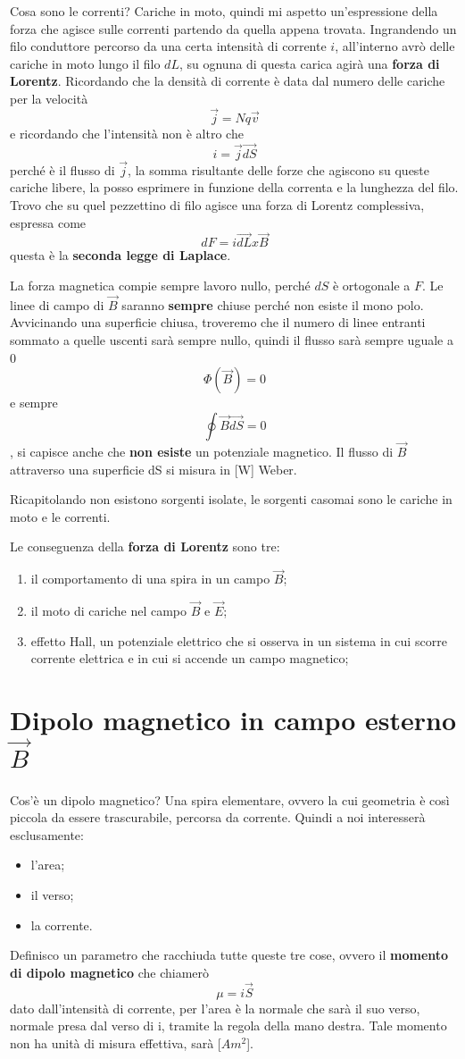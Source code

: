 \documentclass[a4paper, 12pt]{book}
\theoremstyle{plain}
\begin{document}
Cosa sono le correnti? Cariche in moto, quindi mi aspetto 
un'espressione della forza che agisce sulle correnti 
partendo da quella appena trovata. Ingrandendo un filo conduttore
percorso da una certa intensità di corrente $i$, all'interno 
avrò delle cariche in moto lungo il filo $dL$, su ognuna di questa 
carica agirà una \textbf{forza di Lorentz}. Ricordando che la 
densità di corrente è data dal numero delle cariche per 
la velocità \[ \vec{j} = Nq\vec{v} \] e ricordando che 
l'intensità non è altro che \[ i = \vec{j} \vec{dS} \] 
perché è il flusso di $\vec{j}$, la somma risultante delle 
forze che agiscono su queste cariche libere, la posso esprimere 
in funzione della correnta e la lunghezza del filo. Trovo 
che su quel pezzettino di filo agisce una forza di Lorentz
complessiva, espressa come \[ dF = i\vec{dL}x\vec{B} \] 
questa è la \textbf{seconda legge di Laplace}. 

La forza magnetica compie sempre lavoro nullo, perché $dS$ 
è ortogonale a $F$. Le linee di campo di $\vec{B}$ saranno \textbf{sempre} 
chiuse perché non esiste il mono polo. Avvicinando 
una superficie chiusa, troveremo che il numero di linee 
entranti sommato a quelle uscenti sarà sempre nullo, quindi 
il flusso sarà sempre uguale a 0 \[ \Phi (\vec{B}) = 0 \] 
e sempre \[ \oint \vec{B} \vec{dS} = 0 \], si capisce 
anche che \textbf{non esiste} un potenziale magnetico.
Il flusso di $\vec{B}$ attraverso una superficie dS si misura 
in [W] Weber.

Ricapitolando non esistono sorgenti isolate, le sorgenti 
casomai sono le cariche in moto e le correnti.

Le conseguenza della \textbf{forza di Lorentz} sono tre:
\begin{enumerate}
    \item il comportamento di una spira in un campo $\vec{B}$;
    \item il moto di cariche nel campo $\vec{B}$ e $\vec{E}$;
    \item effetto Hall, un potenziale elettrico che si osserva in un sistema in cui scorre corrente elettrica e in cui si accende un campo magnetico;
\end{enumerate}

\section{Dipolo magnetico in campo esterno $\vec{B}$}

Cos'è un dipolo magnetico? Una spira elementare,
ovvero la cui geometria è così piccola da 
essere trascurabile, percorsa da corrente. Quindi a noi 
interesserà esclusamente:
\begin{itemize}
    \item l'area;
    \item il verso; 
    \item la corrente.
\end{itemize}
Definisco un parametro che racchiuda tutte queste tre cose,
ovvero il \textbf{momento di dipolo magnetico} che chiamerò 
\[ \mu = i\vec{S} \] dato dall'intensità di corrente, per l'area 
è la normale che sarà il suo verso, normale presa dal verso di i, 
tramite la regola della mano destra. Tale momento non ha 
unità di misura effettiva, sarà [$Am^2$].
\end{document}
